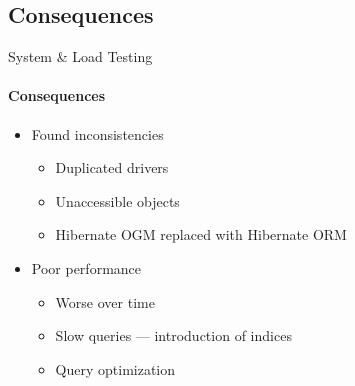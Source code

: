\subsection{Consequences}
\begin{frame}{System \& Load Testing}
        \framesubtitle{Consequences}
        \begin{itemize}
            \item<1-> Found inconsistencies
                \begin{itemize}
                    \item<1-> Duplicated drivers
                    \item<1-> Unaccessible objects
                    \item<2-> Hibernate OGM replaced with Hibernate ORM
                \end{itemize}
            \item<3-> Poor performance
                \begin{itemize}
                    \item<3-> Worse over time
                    \item<4-> Slow queries --- introduction of indices
                    \item<4-> Query optimization
                \end{itemize}
        \end{itemize}
\end{frame}
